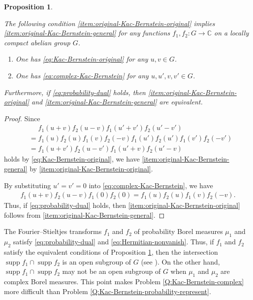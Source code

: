 \documentclass[12pt]{article}
\newtheorem{proposition}[theorem]{Proposition}
\theoremstyle{definition}
\theoremstyle{remark}
\numberwithin{equation}{section}
\numberwithin{figure}{section}
\numberwithin{table}{section}
\DeclareMathOperator{\supp}{supp}
\begin{document}
\begin{proposition}
    \label{prop:original-Kac-Bernstein}

The following condition \ref{item:original-Kac-Bernstein-original} implies \ref{item:original-Kac-Bernstein-general} for any functions $ f_1 , f_2 \colon G \to \mathbb{ C } $ on a locally compact abelian group $ G $.

\begin{enumerate}

\item \label{item:original-Kac-Bernstein-original}

One has \eqref{eq:Kac-Bernstein-original} for any $ u , v \in G $.
\item \label{item:original-Kac-Bernstein-general}

One has \eqref{eq:complex-Kac-Bernstein} for any $ u , u' , v , v' \in G $.
\end{enumerate}

Furthermore, if \eqref{eq:probability-dual} holds, then \ref{item:original-Kac-Bernstein-original} and \ref{item:original-Kac-Bernstein-general} are equivalent.

\end{proposition}

\begin{proof}

Since 
\begin{align}
    & \phantom{ {} = {} } f_1 ( u + v ) f_2 ( u - v ) f_1 ( u' + v' ) f_2 ( u' - v' ) \\
    & = f_1 ( u ) f_2 ( u ) f_1 ( v ) f_2 ( - v ) f_1 ( u' ) f_2 ( u' ) f_1 ( v' ) f_2 ( - v' ) \\
    & = f_1 ( u + v' ) f_2 ( u - v' ) f_1 ( u' + v ) f_2 ( u' - v )
\end{align}
holds by \eqref{eq:Kac-Bernstein-original}, we have \ref{item:original-Kac-Bernstein-general} by \ref{item:original-Kac-Bernstein-original}.

By substituting $ u' = v' = 0 $ into \eqref{eq:complex-Kac-Bernstein}, we have
\begin{align}
    f_1 ( u + v ) f_2 ( u - v ) f_1 ( 0 ) f_2 ( 0 )
    = f_1 ( u ) f_2 ( u ) f_1 ( v ) f_2 ( - v ).
\end{align}
Thus, if \eqref{eq:probability-dual} holds, then \ref{item:original-Kac-Bernstein-original} follows from \ref{item:original-Kac-Bernstein-general}.
\end{proof}

The Fourier--Stieltjes transforms $ f_1 $ and $ f_2 $ of probability Borel measures $ \mu_1 $ and $ \mu_2 $ satisfy \eqref{eq:probability-dual} and \eqref{eq:Hermitian-nonvanish}.
Thus, if $ f_1 $ and $ f_2 $ satisfy the equivalent conditions of Proposition \ref{prop:original-Kac-Bernstein}, then the intersection $ \supp f_1 \cap \supp f_2 $ is an open subgroup of $ G $ (see \cite[Theorem 1]{MR3626791}).
On the other hand, $ \supp f_1 \cap \supp f_2 $ may not be an open subgroup of $ G $ when $ \mu_1 $ and $ \mu_2 $ are complex Borel measures.
This point makes Problem \ref{Q:Kac-Bernstein-complex} more difficult than Problem \ref{Q:Kac-Bernstein-probability-represent}.
\end{document}
